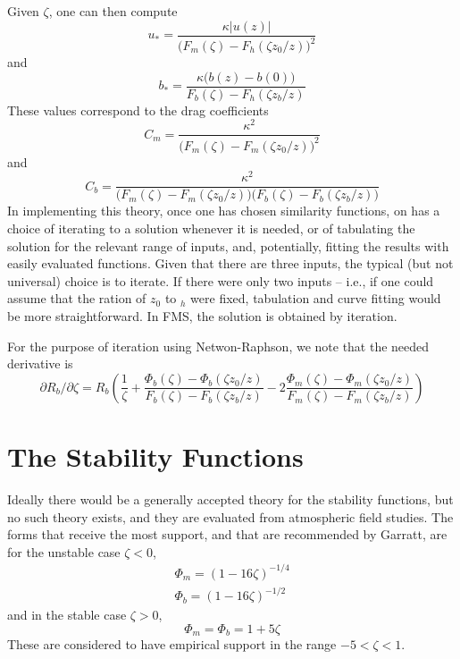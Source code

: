 \documentclass[12pt, letterpaper]{article}
\begin{document}
Given $\zeta$, one can then compute
\begin{equation}
  u_* = \frac{\kappa |u(z)|}{\big(F_m(\zeta) - F_h(\zeta z_0/z)\big)^2}
\end{equation}
and
\begin{equation}
  b_* = \frac{\kappa\big(b(z) - b(0)\big)}{F_b(\zeta)-F_h(\zeta z_b/z)}
\end{equation}
These values correspond to the drag coefficients
\begin{equation}
  C_m = \frac{\kappa^2}{\big(F_m(\zeta) - F_m(\zeta z_0/z)\big)^2}
\end{equation}
and
\begin{equation}
  C_b = \frac{\kappa^2}{\big(F_m(\zeta) - F_m(\zeta z_0/z)\big)\big(F_b(\zeta)-F_b(\zeta z_b/z)\big)}
\end{equation}
In implementing this theory, once one has chosen similarity functions,
on has a choice of iterating to a solution whenever it is needed, or
of tabulating the solution for the relevant range of inputs, and,
potentially, fitting the results with easily evaluated functions.
Given that there are three inputs, the typical (but not universal)
choice is to iterate.  If there were only two inputs -- i.e., if one
could assume that the ration of $z_0$ to $_h$ were fixed, tabulation
and curve fitting would be more straightforward.  In FMS, the solution
is obtained by iteration.

For the purpose of iteration using Netwon-Raphson, we note that the
needed derivative is
\begin{equation}
  \partial R_b/\partial \zeta = R_b\left(\frac{1}{\zeta} + \frac{\Phi_b(\zeta)-\Phi_b(\zeta z_0/z)}{F_b(\zeta)-F_b(\zeta z_b/z)} -
  2\frac{\Phi_m(\zeta)-\Phi_m(\zeta z_0/z)}{F_m(\zeta)-F_m(\zeta z_b/z)}\right)
\end{equation}

\section{The Stability Functions}

Ideally there would be a generally accepted theory for the stability
functions, but no such theory exists, and they are evaluated from
atmospheric field studies.  The forms that receive the most support,
and that are recommended by Garratt, are for the unstable case $\zeta
< 0$,
\begin{gather}
  \Phi_m = (1 - 16\zeta)^{-1/4} \label{eq:stabfuncm} \\
  \Phi_b = (1 - 16\zeta)^{-1/2} \label{eq:stabfuncb}
\end{gather}
and in the stable case $\zeta > 0$,
\begin{equation}
  \Phi_m = \Phi_b = 1+5\zeta \label{eq:stablephi}
\end{equation}
These are considered to have empirical support in the range
$-5<\zeta<1$.
\end{document}
